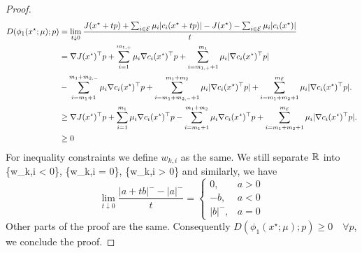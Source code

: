 \begin{proof}
    \begin{align}
        D(\phi_1(x^\star;\mu);p) &= \lim_{t \downarrow 0} \frac{J(x^\star + tp) + \sum_{i \in {\cal E}}\mu_i|c_i(x^\star + tp)| - J(x^\star) - \sum_{i \in {\cal E}}\mu_i|c_i(x^\star)|}{t} \\
        &= \nabla J(x^\star)^\top p + \sum_{i=1}^{m_{1,+}} \mu_i\nabla c_i(x^\star)^\top p + \sum_{i=m_{1,+}+1}^{m_1} \mu_i|\nabla c_i(x^\star)^\top p|\\ 
        &- \sum_{i=m_1+1}^{m_1+m_{2,-}} \mu_i\nabla c_i(x^\star)^\top p+ \sum_{i=m_1+m_{2,-}+1}^{m_1+m_2} \mu_i|\nabla c_i(x^\star)^\top p| 
        + \sum_{i=m_1+m_2+1}^{m_{\cal E}} \mu_i|\nabla c_i(x^\star)^\top p|.\\
        & \geq \nabla J(x^\star)^\top p + \sum_{i=1}^{m_1} \mu_i\nabla c_i(x^\star)^\top p 
         - \sum_{i=m_1+1}^{m_1+m_2} \mu_i\nabla c_i(x^\star)^\top p
        + \sum_{i=m_1+m_2+1}^{m_{\cal E}} \mu_i|\nabla c_i(x^\star)^\top p|.\\
        & \geq 0
    \end{align}
    For inequality constraints we define $w_{k,i}$ as the same. We still separate ${ {\mathbb R}^{} }$ into 
    \bea
    \{w_{k,i} < 0\}, \{w_{k,i} = 0\}, \{w_{k,i} > 0\}
    \eea
    and similarly, we have
    \begin{equation}
        \lim_{t \downarrow 0} \frac{| a + tb |^- - | a |^-}{t} = \begin{cases}
            0, & a > 0 \\
            -b, & a < 0 \\
            |b|^-, & a = 0
        \end{cases}
    \end{equation}
    Other parts of the proof are the same. Consequently $D(\phi_1(x^\star;\mu);p) \geq 0 \quad\forall p$, we conclude the proof.
\end{proof}





